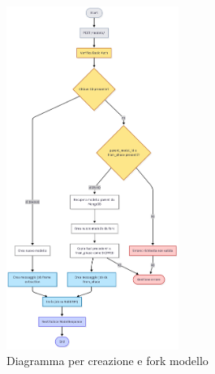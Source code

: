 \begin{figure}[ht]
	\centering
	\includegraphics[width=0.5\textwidth]{images/create_or_fork_diagram.jpg}
	\caption{Diagramma per creazione e fork modello}
	\label{fig:create_or_fork_diagram}
\end{figure}

